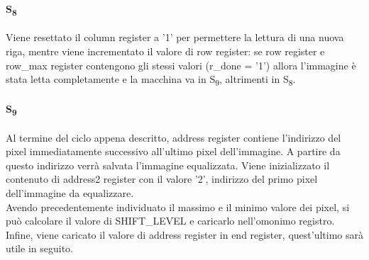 \paragraph{S\textsubscript{8}}
Viene resettato il column register a '1' per permettere la lettura di una nuova riga, mentre viene incrementato il valore di row register: se row register e row\_max register contengono gli stessi valori (r\_done = '1') allora l'immagine è stata letta completamente e la macchina va in S\textsubscript{9}, altrimenti in S\textsubscript{8}.

\paragraph{S\textsubscript{9}}
Al termine del ciclo appena descritto, address register contiene l'indirizzo del pixel immediatamente successivo all'ultimo pixel dell'immagine. A partire da questo indirizzo verrà salvata l'immagine equalizzata.
Viene inizializzato il contenuto di address2 register con il valore '2', indirizzo del primo pixel dell'immagine da equalizzare.\\
Avendo precedentemente individuato il massimo e il minimo valore dei pixel, si può calcolare %
il valore di SHIFT\_LEVEL e caricarlo nell'omonimo registro.
Infine, viene caricato il valore di address register in end register, quest'ultimo sarà utile in seguito.
